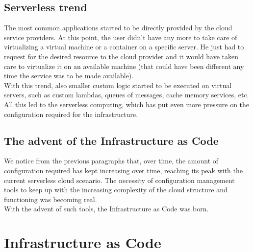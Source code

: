 \subsection{Serverless trend}
The most common applications started to be directly provided by the cloud service providers.
At this point, the user didn't have any more to take care of virtualizing a virtual machine or a container on a specific server.
He just had to request for the desired resource to the cloud provider and it would have taken care to virtualize it on an available machine (that could have been different any time the service was to be made available).\\
With this trend, also smaller custom logic started to be executed on virtual servers, such as custom lambdas, queues of messages, cache memory services, etc.\\
All this led to the serverless computing, which has put even more pressure on the configuration required for the infrastructure.

\subsection{The advent of the Infrastructure as Code}
We notice from the previous paragraphs that, over time, the amount of configuration required has kept increasing over time, reaching its peak with the current serverless cloud scenario.
The necessity of configuration management tools to keep up with the increasing complexity of the cloud structure and functioning was becoming real.\\
With the advent of such tools, the Infrastructure as Code was born.


\section{Infrastructure as Code}

